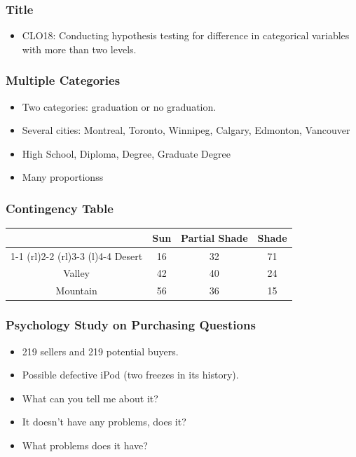 \documentclass{beamer}
\begin{document}
\begin{frame}
  \frametitle{Title}
  \begin{itemize}
    \item[] 
    CLO18: Conducting hypothesis testing for difference in categorical
    variables with more than two levels.
  \end{itemize}
\end{frame}

\begin{frame}
  \frametitle{Multiple Categories}
  \begin{itemize}
    \item[] 
      Two categories: graduation or no graduation.
      \vspace{0.5cm}
    \item[] 
      Several cities: Montreal, Toronto, Winnipeg, Calgary, Edmonton,
      Vancouver
      \vspace{0.5cm}
    \item[] 
      High School, Diploma, Degree, Graduate Degree
      \vspace{0.5cm}
    \item[] 
      Many proportionss
  \end{itemize}
\end{frame}

\begin{frame}
  \frametitle{Contingency Table}
  \begin{table}
    \begin{tabular}{@{}cccc@{}}
      \toprule
      & Sun & Partial Shade & Shade \\
      \cmidrule(r){1-1} \cmidrule(rl){2-2} \cmidrule(rl){3-3}
      \cmidrule(l){4-4}
      Desert & 16 & 32 & 71 \\[0.3em]
      Valley & 42 & 40 & 24 \\[0.3em]
      Mountain & 56 & 36 & 15 \\
      \bottomrule
    \end{tabular}
  \end{table}
\end{frame}

\begin{frame}
  \frametitle{Psychology Study on Purchasing Questions}
  \begin{itemize}
    \item[] 
      219 sellers and 219 potential buyers.
      \vspace{0.5cm}
    \item[] 
      Possible defective iPod (two freezes in its history). 
      \vspace{0.5cm}
    \item[] 
      What can you tell me about it?
      \vspace{0.5cm}
    \item[] 
      It doesn't have any problems, does it?
      \vspace{0.5cm}
    \item[] 
      What problems does it have?
  \end{itemize}
\end{frame}
\end{document}
